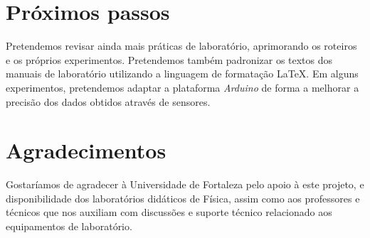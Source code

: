 \documentclass[portrait,a0]{a0poster}
\begin{document}
\begin{multicols}{2}
\color{DarkSlateGray} %

\section*{Próximos passos}

Pretendemos revisar ainda mais práticas de laboratório, aprimorando os roteiros e os próprios experimentos.
Pretendemos também padronizar os textos dos manuais de laboratório utilizando a linguagem de formatação \LaTeX.
Em alguns experimentos, pretendemos adaptar a plataforma \emph{Arduino} de forma a melhorar a precisão dos dados obtidos através de sensores.



\printbibliography


\section*{Agradecimentos}

Gostaríamos de agradecer à Universidade de Fortaleza pelo apoio à este projeto, e disponibilidade dos laboratórios didáticos de Física, assim como aos professores e técnicos que nos auxiliam com discussões e suporte técnico relacionado aos equipamentos de laboratório.



\end{multicols}
\end{document}
